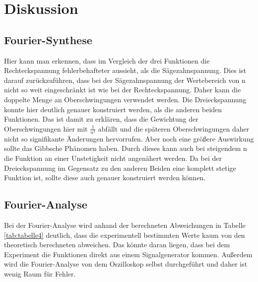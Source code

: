 \section{Diskussion}
\label{sec:Diskussion}
\subsection{Fourier-Synthese}
Hier kann man erkennen, dass im Vergleich der drei Funktionen die Rechteckspannung fehlerbehafteter aussieht, als die Sägezahnspannung.
Dies ist darauf zurückzuführen, dass bei der Sägezahnspannung der Wertebereich von n nicht so weit eingeschränkt ist wie bei der Rechteckspannung.
Daher kann die doppelte Menge an Oberschwingungen verwendet werden.
Die Dreieckspannung konnte hier deutlich genauer konstruiert werden, als die anderen beiden Funktionen.
Das ist damit zu erklären, dass die Gewichtung der Oberschwingungen hier mit $\frac{1}{n^2}$ abfällt und die späteren Oberschwingungen daher nicht so signifikante Änderungen hervorrufen.
Aber noch eine größere Auswirkung sollte das Gibbsche Phänomen haben.
Durch dieses kann auch bei steigendem n die Funktion an einer Unstetigkeit nicht angenähert werden.
Da bei der Dreieckspannung im Gegensatz zu den anderen Beiden eine komplett stetige Funktion ist, sollte diese auch genauer konstruiert werden können.

\subsection{Fourier-Analyse}
Bei der Fourier-Analyse wird anhand der berechneten Abweichungen in Tabelle \ref{tab:tabelle4} deutlich, dass die experimentell bestimmten Werte kaum von den theoretisch berechneten abweichen.
Das könnte daran liegen, dass bei dem Experiment die Funktionen direkt aus einem Signalgenerator kommen.
Außerdem wird die Fourier-Analyse von dem Oszilloskop selbst durchgeführt und daher ist wenig Raum für Fehler.

 
